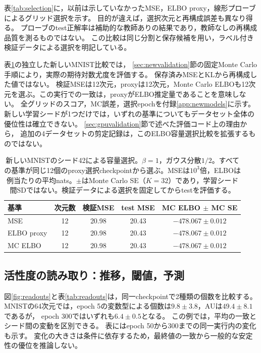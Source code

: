 \documentclass[11pt,a4paper]{ltjsarticle}
\begin{document}
表\ref{tab:selection}に，以前は示していなかったMSE，ELBO proxy，線形プローブによるグリッド選択を示す。
目的が違えば，選択次元と再構成誤差も異なり得る。
プローブのtest正解率は補助的な教師ありの結果であり，教師なしの再構成品質を測るものではない。
この比較は同じ分割と保存候補を用い，ラベル付き検証データによる選択を明記している。

表\ref{tab:mcselection}の独立した新しいMNIST比較では，
\ref{sec:newvalidation}節の固定Monte Carlo手順により，実際の期待対数尤度を評価する。
保存済みMSEとKLから再構成した値ではない。
検証MSEは12次元，proxyは12次元，Monte Carlo ELBOも12次元を選ぶ。この実行での一致は，proxyがELBO推定量であることを意味しない。
全グリッドのスコア，MC誤差，選択epochを付録\ref{app:newmodels}に示す。
新しい学習シードが1つだけでは，いずれの基準についてもデータセット全体の優位性は確立できない。
\ref{sec:gpuvalidation}節で述べた評価コード上の理由から，
追加の4データセットの剪定記録は，このELBO容量選択比較を拡張するものではない。

\begin{table}[H]
\caption{新しいMNISTのシード42による容量選択。$\beta=1$，ガウス分散$1/2$。すべての基準が同じ12個のproxy選択checkpointから選ぶ。MSEは$10^3$倍，ELBOは例当たりの平均nats。$\pm$はMonte Carlo SE（$K=32$）であり，学習シード間SDではない。検証データによる選択を固定してからtestを評価する。}\label{tab:mcselection}
\small
\setlength{\tabcolsep}{3pt}
\begin{tabular*}{\textwidth}{@{\extracolsep{\fill}}lcccc@{}}
\toprule
基準 & 次元数 & 検証MSE & test MSE & MC ELBO $\pm$ MC SE \\
\midrule
MSE & 12 & 20.98 & 20.43 & $-478.067 \pm 0.012$ \\
ELBO proxy & 12 & 20.98 & 20.43 & $-478.067 \pm 0.012$ \\
MC ELBO & 12 & 20.98 & 20.43 & $-478.067 \pm 0.012$ \\
\bottomrule\end{tabular*}
\end{table}

\subsection{活性度の読み取り：推移，閾値，予測}\label{sec:au}
図\ref{fig:readouts}と表\ref{tab:readouts}は，同一checkpointで2種類の個数を比較する。
MNISTの64次元では，epoch 5の変数型による個数は$9.8\pm3.8$，AUは$49.4\pm8.1$であるが，
epoch 300ではいずれも$6.4\pm0.5$となる。
この例では，平均の一致とシード間の変動を区別できる。
表にはepoch 50から300までの同一実行内の変化も示す。
変化の大きさは条件に依存するため，最終値の一致から一般的な安定性の優位を推論しない。
\end{document}
